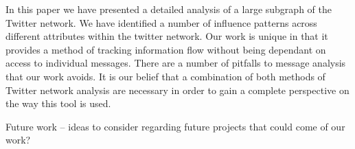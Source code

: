 In this paper we have presented a detailed analysis of a large subgraph of the Twitter network.  We have identified a number of influence patterns across different attributes within the twitter network.  Our work is unique in that it provides a method of tracking information flow without being dependant on access to individual messages.  There are a number of pitfalls to message analysis that our work avoids.  It is our belief that a combination of both methods of Twitter network analysis are necessary in order to gain a complete perspective on the way this tool is used.

Future work -- ideas to consider regarding future projects that could come of our work?